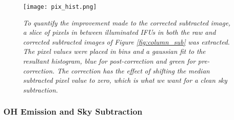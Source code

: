 \documentclass{literature}
\begin{document}
\begin{figure}[!htp]
\centering
\texttt{[image: pix\_hist.png]}
\caption{\footnotesize{\emph{To quantify the improvement made to the corrected subtracted image, a slice of pixels in between illuminated IFUs in both the raw and corrected subtracted images of Figure \ref{fig:column_sub} was extracted. The pixel values were placed in bins and a gaussian fit to the resultant histogram, blue for post-correction and green for pre-correction. The correction has the effect of shifting the median subtracted pixel value to zero, which is what we want for a clean sky subtraction. }}}
\label{fig:pix_hist}
\end{figure}





\subsubsection{OH Emission and Sky Subtraction}
\end{document}
